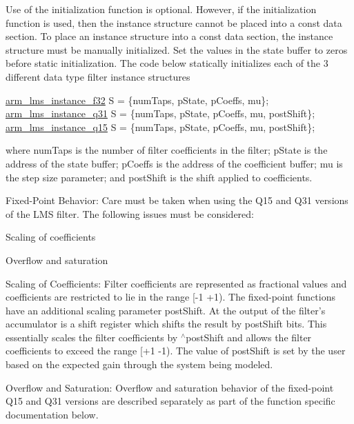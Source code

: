 \begin{DoxyParagraph}{}
Use of the initialization function is optional. However, if the initialization function is used, then the instance structure cannot be placed into a const data section. To place an instance structure into a const data section, the instance structure must be manually initialized. Set the values in the state buffer to zeros before static initialization. The code below statically initializes each of the 3 different data type filter instance structures 
\begin{DoxyPre}    
    \hyperlink{structarm__lms__instance__f32}{arm\_lms\_instance\_f32} S = \{numTaps, pState, pCoeffs, mu\};    
    \hyperlink{structarm__lms__instance__q31}{arm\_lms\_instance\_q31} S = \{numTaps, pState, pCoeffs, mu, postShift\};    
    \hyperlink{structarm__lms__instance__q15}{arm\_lms\_instance\_q15} S = \{numTaps, pState, pCoeffs, mu, postShift\};    
 \end{DoxyPre}
 where {\ttfamily num\-Taps} is the number of filter coefficients in the filter; {\ttfamily p\-State} is the address of the state buffer; {\ttfamily p\-Coeffs} is the address of the coefficient buffer; {\ttfamily mu} is the step size parameter; and {\ttfamily post\-Shift} is the shift applied to coefficients.
\end{DoxyParagraph}
\begin{DoxyParagraph}{Fixed-\/\-Point Behavior\-: }
Care must be taken when using the Q15 and Q31 versions of the L\-M\-S filter. The following issues must be considered\-:
\begin{DoxyItemize}
\item Scaling of coefficients
\item Overflow and saturation
\end{DoxyItemize}
\end{DoxyParagraph}
\begin{DoxyParagraph}{Scaling of Coefficients\-: }
Filter coefficients are represented as fractional values and coefficients are restricted to lie in the range {\ttfamily \mbox{[}-\/1 +1)}. The fixed-\/point functions have an additional scaling parameter {\ttfamily post\-Shift}. At the output of the filter's accumulator is a shift register which shifts the result by {\ttfamily post\-Shift} bits. This essentially scales the filter coefficients by {$^\wedge$post\-Shift} and allows the filter coefficients to exceed the range {\ttfamily \mbox{[}+1 -\/1)}. The value of {\ttfamily post\-Shift} is set by the user based on the expected gain through the system being modeled.
\end{DoxyParagraph}
\begin{DoxyParagraph}{Overflow and Saturation\-: }
Overflow and saturation behavior of the fixed-\/point Q15 and Q31 versions are described separately as part of the function specific documentation below. 
\end{DoxyParagraph}


